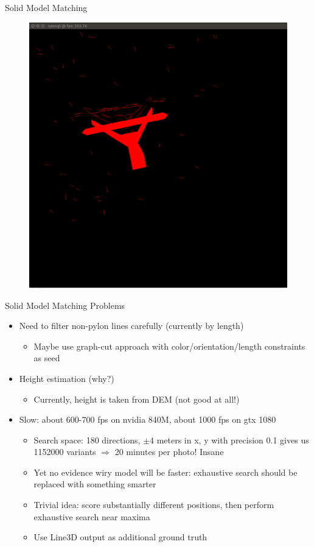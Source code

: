 \documentclass{beamer}
\begin{document}
\begin{frame}[t, fragile]{Solid Model Matching}
\begin{figure}
\centering
\includegraphics[scale=0.18]{render}
\end{figure}
\end{frame}

\begin{frame}[t, fragile]{Solid Model Matching Problems}
\begin{itemize}
\item Need to filter non-pylon lines carefully (currently by length)
\begin{itemize}
\item Maybe use graph-cut approach with color/orientation/length constraints as seed
\end{itemize}
\item Height estimation (why?)
\begin{itemize}
\item Currently, height is taken from DEM (not good at all!)
\end{itemize}
\item Slow: about 600-700 fps on nvidia 840M, about 1000 fps on gtx 1080
\begin{itemize}
\item Search space: 180 directions, $\pm 4$ meters in x, y with precision 0.1 gives us 1152000 variants $\Rightarrow$ 20 minutes per photo! Insane
\item Yet no evidence wiry model will be faster: exhaustive search should be replaced with something smarter
\item Trivial idea: score substantially different positions, then perform exhaustive search near maxima
\item Use Line3D output as additional ground truth
\end{itemize}
\end{itemize}
\end{frame}
\end{document}
